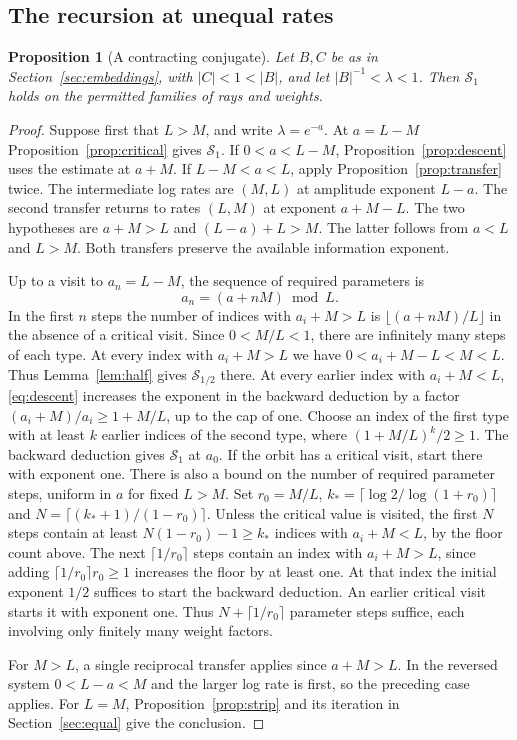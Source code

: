 \documentclass[11pt,a4paper]{article}
\newtheorem{proposition}[theorem]{Proposition}
\begin{document}
\subsection{The recursion at unequal rates}\label{sec:closure}
\begin{proposition}[A contracting conjugate]\label{prop:two}
Let $B,C$ be as in Section~\ref{sec:embeddings}, with
$|C|<1<|B|$, and let $|B|^{-1}<\lambda<1$.
Then $\mathcal S_1$ holds on the permitted families of rays and weights.
\end{proposition}
\begin{proof}
Suppose first that $L>M$, and write $\lambda=e^{-a}$.
At $a=L-M$ Proposition~\ref{prop:critical} gives $\mathcal S_1$.
If $0<a<L-M$, Proposition~\ref{prop:descent} uses the estimate at $a+M$.
If $L-M<a<L$, apply Proposition~\ref{prop:transfer} twice.
The intermediate log rates are $(M,L)$ at amplitude exponent $L-a$.
The second transfer returns to rates $(L,M)$ at exponent $a+M-L$.
The two hypotheses are $a+M>L$ and $(L-a)+L>M$.
The latter follows from $a<L$ and $L>M$.
Both transfers preserve the available information exponent.

Up to a visit to $a_n=L-M$, the sequence of required parameters is
\[
 a_n=(a+nM)\bmod L.
\]
In the first $n$ steps the number of indices with $a_i+M>L$ is
$\lfloor(a+nM)/L\rfloor$ in the absence of a critical visit.
Since $0<M/L<1$, there are infinitely many steps of each type.
At every index with $a_i+M>L$ we have
$0<a_i+M-L<M<L$. Thus Lemma~\ref{lem:half} gives
$\mathcal S_{1/2}$ there. At every earlier index with $a_i+M<L$,
\eqref{eq:descent} increases the exponent in the backward deduction
by a factor $(a_i+M)/a_i\ge1+M/L$, up to the cap of one.
Choose an index of the first type with at least $k$ earlier indices
of the second type, where $(1+M/L)^k/2\ge1$.
The backward deduction gives $\mathcal S_1$ at $a_0$.
If the orbit has a critical visit, start there with exponent one.
There is also a bound on the number of required parameter steps, uniform
in $a$ for fixed $L>M$. Set $r_0=M/L$,
$k_* = \lceil\log 2/\log(1+r_0)\rceil$ and
$N=\lceil(k_*+1)/(1-r_0)\rceil$. Unless the critical value is visited,
the first $N$ steps contain at least $N(1-r_0)-1\ge k_*$
indices with $a_i+M<L$, by the floor count above. The next
$\lceil1/r_0\rceil$ steps contain an index with $a_i+M>L$, since
adding $\lceil1/r_0\rceil r_0\ge1$ increases the floor by at least one.
At that index the initial exponent $1/2$ suffices to start the backward
deduction. An earlier critical visit starts it with exponent one.
Thus $N+\lceil1/r_0\rceil$ parameter steps suffice, each involving
only finitely many weight factors.

For $M>L$, a single reciprocal transfer applies since $a+M>L$.
In the reversed system $0<L-a<M$ and the larger log rate is first,
so the preceding case applies. For $L=M$, Proposition~\ref{prop:strip}
and its iteration in Section~\ref{sec:equal} give the conclusion.
\end{proof}
\end{document}
